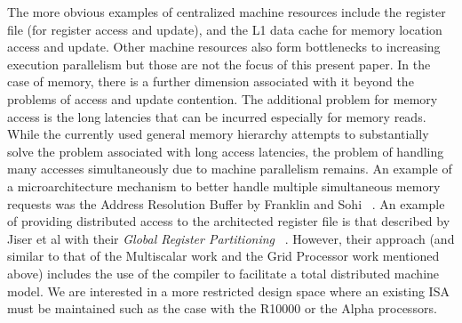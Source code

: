 \documentclass[10pt,dvips]{article}
\begin{document}
The more obvious examples of centralized machine resources include
the register file (for register access and update),
and the L1 data cache for memory location access and update.
Other machine resources also form bottlenecks to increasing
execution parallelism but those are not the focus of this present
paper.
In the case of memory, there is a further dimension associated
with it beyond the problems of access and update contention.
The additional problem for memory access is the long latencies
that can be incurred especially for memory reads.
While the currently used general memory hierarchy
attempts to substantially solve
the problem associated with long access latencies, the problem of
handling many accesses simultaneously due to machine parallelism remains.
An example of a microarchitecture mechanism to better handle
multiple simultaneous memory requests was the Address Resolution
Buffer by Franklin and Sohi ~\cite{franklin96arb}.
An example of providing distributed access to the architected
register file is that described by Jiser et al with their
\textit{Global Register Partitioning} ~\cite{Jiser00}.
However, their approach (and similar to that of the Multiscalar
work and the Grid Processor work mentioned above) includes
the use of the compiler to facilitate a total distributed 
machine model.
We are interested in a more restricted design space where an existing
ISA must be maintained such as the case with the R10000 or the Alpha
processors.
\end{document}
